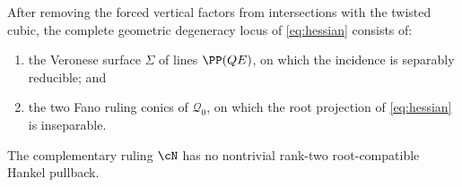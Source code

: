 \begin{theorem}
\label{thm:hessian}
After removing the forced vertical factors from intersections with the
twisted cubic, the complete geometric degeneracy locus of
\eqref{eq:hessian} consists of:
\begin{enumerate}[label=\textup{(\roman*)}]
\item the Veronese surface $\Sigma$ of lines $\PP(QE)$, on which the incidence is
      separably reducible; and
\item the two Fano ruling conics of $\mathcal Q_0$, on which the root
      projection of \eqref{eq:hessian} is inseparable.
\end{enumerate}
The complementary ruling $\cN$ has no nontrivial rank-two root-compatible
Hankel pullback.
\end{theorem}


